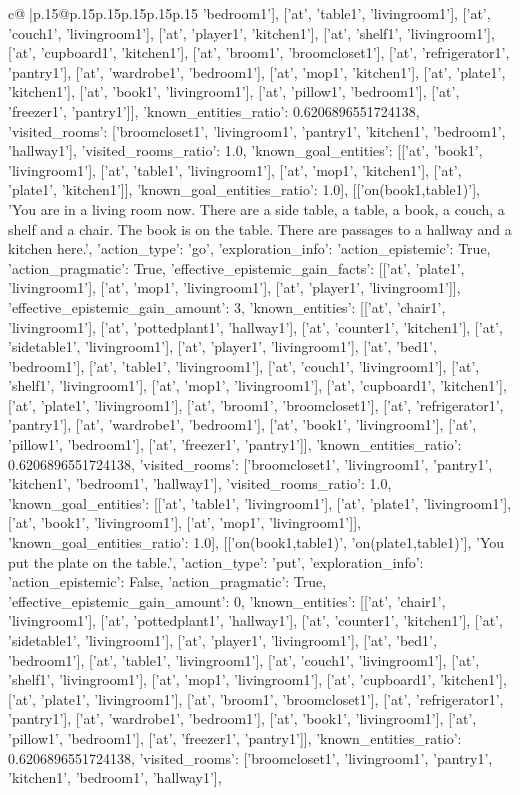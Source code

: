 \documentclass{article}
\begin{document}
{\begin{supertabular}{c@{$\;$}|p{.15\linewidth}@{}p{.15\linewidth}p{.15\linewidth}p{.15\linewidth}p{.15\linewidth}p{.15\linewidth}}
{{{'bedroom1'], ['at', 'table1', 'livingroom1'], ['at', 'couch1', 'livingroom1'], ['at', 'player1', 'kitchen1'], ['at', 'shelf1', 'livingroom1'], ['at', 'cupboard1', 'kitchen1'], ['at', 'broom1', 'broomcloset1'], ['at', 'refrigerator1', 'pantry1'], ['at', 'wardrobe1', 'bedroom1'], ['at', 'mop1', 'kitchen1'], ['at', 'plate1', 'kitchen1'], ['at', 'book1', 'livingroom1'], ['at', 'pillow1', 'bedroom1'], ['at', 'freezer1', 'pantry1']], 'known_entities_ratio': 0.6206896551724138, 'visited_rooms': ['broomcloset1', 'livingroom1', 'pantry1', 'kitchen1', 'bedroom1', 'hallway1'], 'visited_rooms_ratio': 1.0, 'known_goal_entities': [['at', 'book1', 'livingroom1'], ['at', 'table1', 'livingroom1'], ['at', 'mop1', 'kitchen1'], ['at', 'plate1', 'kitchen1']], 'known_goal_entities_ratio': 1.0}}], [['on(book1,table1)'], 'You are in a living room now. There are a side table, a table, a book, a couch, a shelf and a chair. The book is on the table. There are passages to a hallway and a kitchen here.', {'action_type': 'go', 'exploration_info': {'action_epistemic': True, 'action_pragmatic': True, 'effective_epistemic_gain_facts': [['at', 'plate1', 'livingroom1'], ['at', 'mop1', 'livingroom1'], ['at', 'player1', 'livingroom1']], 'effective_epistemic_gain_amount': 3, 'known_entities': [['at', 'chair1', 'livingroom1'], ['at', 'pottedplant1', 'hallway1'], ['at', 'counter1', 'kitchen1'], ['at', 'sidetable1', 'livingroom1'], ['at', 'player1', 'livingroom1'], ['at', 'bed1', 'bedroom1'], ['at', 'table1', 'livingroom1'], ['at', 'couch1', 'livingroom1'], ['at', 'shelf1', 'livingroom1'], ['at', 'mop1', 'livingroom1'], ['at', 'cupboard1', 'kitchen1'], ['at', 'plate1', 'livingroom1'], ['at', 'broom1', 'broomcloset1'], ['at', 'refrigerator1', 'pantry1'], ['at', 'wardrobe1', 'bedroom1'], ['at', 'book1', 'livingroom1'], ['at', 'pillow1', 'bedroom1'], ['at', 'freezer1', 'pantry1']], 'known_entities_ratio': 0.6206896551724138, 'visited_rooms': ['broomcloset1', 'livingroom1', 'pantry1', 'kitchen1', 'bedroom1', 'hallway1'], 'visited_rooms_ratio': 1.0, 'known_goal_entities': [['at', 'table1', 'livingroom1'], ['at', 'plate1', 'livingroom1'], ['at', 'book1', 'livingroom1'], ['at', 'mop1', 'livingroom1']], 'known_goal_entities_ratio': 1.0}}], [['on(book1,table1)', 'on(plate1,table1)'], 'You put the plate on the table.', {'action_type': 'put', 'exploration_info': {'action_epistemic': False, 'action_pragmatic': True, 'effective_epistemic_gain_amount': 0, 'known_entities': [['at', 'chair1', 'livingroom1'], ['at', 'pottedplant1', 'hallway1'], ['at', 'counter1', 'kitchen1'], ['at', 'sidetable1', 'livingroom1'], ['at', 'player1', 'livingroom1'], ['at', 'bed1', 'bedroom1'], ['at', 'table1', 'livingroom1'], ['at', 'couch1', 'livingroom1'], ['at', 'shelf1', 'livingroom1'], ['at', 'mop1', 'livingroom1'], ['at', 'cupboard1', 'kitchen1'], ['at', 'plate1', 'livingroom1'], ['at', 'broom1', 'broomcloset1'], ['at', 'refrigerator1', 'pantry1'], ['at', 'wardrobe1', 'bedroom1'], ['at', 'book1', 'livingroom1'], ['at', 'pillow1', 'bedroom1'], ['at', 'freezer1', 'pantry1']], 'known_entities_ratio': 0.6206896551724138, 'visited_rooms': ['broomcloset1', 'livingroom1', 'pantry1', 'kitchen1', 'bedroom1', 'hallway1'], }}}
\end{supertabular}}
\end{document}
